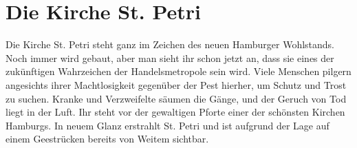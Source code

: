
\chapter{Die Kirche St. Petri}
\label{chap:stpetri}

\begin{advquote}
\large Die Kirche St. Petri steht ganz im Zeichen des neuen Hamburger Wohlstands.
Noch immer wird gebaut, aber man sieht ihr schon jetzt an, dass sie eines der
zukünftigen Wahrzeichen der Handelsmetropole sein wird. Viele Menschen pilgern
angesichts ihrer Machtlosigkeit gegenüber der Pest hierher, um Schutz und Trost zu
suchen. Kranke und Verzweifelte säumen die Gänge, und der Geruch von Tod liegt in
der Luft. Ihr steht vor der gewaltigen Pforte einer der schönsten Kirchen Hamburgs.
In neuem Glanz erstrahlt St. Petri und ist aufgrund der Lage auf einem Geestrücken
bereits von Weitem sichtbar.
\end{advquote}

